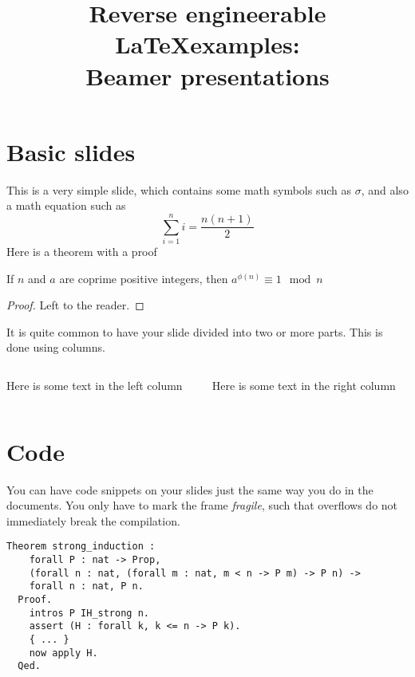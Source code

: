 \documentclass[english, aspectratio=169]{beamer}
\title{
  {\small Reverse engineerable \LaTeX examples:} \\ {Beamer presentations}
}
\institute{
  \textbf{Presenting author},
  other author,
  \\ Aarhus University
}
\begin{document}
\titleframe

\begin{frame}
  \tableofcontents
\end{frame}

\section{Basic slides}
\begin{frame}
  This is a very simple slide, which contains some math symbols such as
  $\sigma$, and also a math equation such as
  \begin{equation*}
    \sum_{i=1}^n i = \frac{n(n+1)}{2}
  \end{equation*}
  Here is a theorem with a proof

  \begin{theorem}[Euler]
    If $n$ and $a$ are coprime positive integers, then $a^{\phi(n)} \equiv 1
    \mod n$
  \end{theorem}
  \begin{proof}
    Left to the reader.
  \end{proof}
\end{frame}

\begin{frame}
  It is quite common to have your slide divided into two or more parts. This is
  done using columns.

  \begin{columns}
    \begin{column}{0.5\textwidth}
      Here is some text in the left column
    \end{column}
    \begin{column}{0.5\textwidth}
      Here is some text in the right column
    \end{column}
  \end{columns}
\end{frame}

\section{Code}
\begin{frame}[fragile]
  You can have code snippets on your slides just the same way you do in the
  documents. You only have to mark the frame \emph{fragile}, such that overflows
  do not immediately break the compilation.

  \begin{lstlisting}[language=coq, caption={Exercise on proving strong induction
      in \cite{SFDiscrete}}]
  Theorem strong_induction :
    forall P : nat -> Prop,
    (forall n : nat, (forall m : nat, m < n -> P m) -> P n) ->
    forall n : nat, P n.
  Proof.
    intros P IH_strong n.
    assert (H : forall k, k <= n -> P k).
    { ... }
    now apply H.
  Qed.
  \end{lstlisting}
\end{frame}
\end{document}
